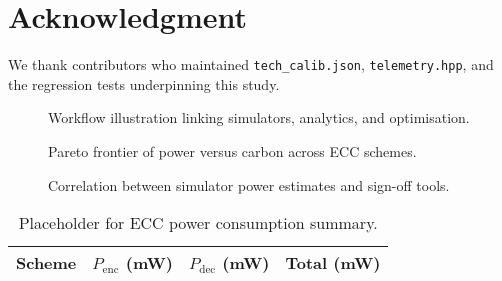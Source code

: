 \documentclass[conference]{IEEEtran}
\begin{document}
\section*{Acknowledgment}
We thank contributors who maintained \texttt{tech\_calib.json}, \texttt{telemetry.hpp}, and the regression tests underpinning this study.




\begin{figure*}[!t]
    \centering
    \caption{Workflow illustration linking simulators, analytics, and optimisation.}
    \label{fig:workflow}
\end{figure*}

\begin{figure}[!t]
    \centering
    \caption{Pareto frontier of power versus carbon across ECC schemes.}
    \label{fig:pareto}
\end{figure}

\begin{figure}[!t]
    \centering
    \caption{Correlation between simulator power estimates and sign-off tools.}
    \label{fig:correlation}
\end{figure}

\begin{table}[!t]
    \centering
    \caption{Placeholder for ECC power consumption summary.}
    \label{tab:power}
    \begin{tabular}{@{}lccc@{}}
        \toprule
        Scheme & $P_{\text{enc}}$ (mW) & $P_{\text{dec}}$ (mW) & Total (mW) \\
        \midrule
        \bottomrule
    \end{tabular}
\end{table}
\end{document}
